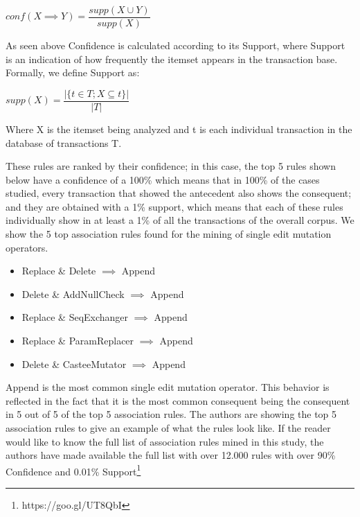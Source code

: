 \documentclass[conference]{IEEEtran}
\begin{document}
\begin{center}
$conf(X \implies Y) = \dfrac{supp(X \cup Y)}{supp(X)}$ 
\end{center}

As seen above Confidence is calculated according to its Support, where Support is an indication of how frequently the itemset appears in the transaction base.
Formally, we define Support as:

\begin{center}
$supp(X) = \dfrac{|\{t \in T; X \subseteq t\}|}{|T|}$
\end{center}

Where X is the itemset being analyzed and t is each individual transaction in the database of transactions T. 

These rules are ranked by their confidence; in this case, the top 5 rules shown below have a confidence of a 100\% which means that in 100\% of the cases studied, every transaction that showed the antecedent also shows the consequent; and they are obtained with a 1\% support, which means that each of these rules individually show in at least a 1\% of all the transactions of the overall corpus. We show the 5  top association rules found for the mining of single edit mutation operators.


\begin{itemize}
\item Replace \& Delete $\implies$ Append
\item Delete \& AddNullCheck $\implies$ Append
\item Replace \& SeqExchanger $\implies$ Append
\item Replace \& ParamReplacer $\implies$ Append
\item Delete \& CasteeMutator $\implies$ Append
\end{itemize}

Append is the most common single edit mutation operator. This behavior is reflected in the fact that it is the most common consequent being the consequent in 5 out of 5 of the top 5 association rules. The authors are showing the top 5 association rules to give an example of what the rules look like. If the reader would like to know the full list of association rules mined in this study, the authors have made available the full list with over 12.000 rules with over 90\% Confidence and 0.01\% Support\footnote{https://goo.gl/UT8QbI}
\end{document}
